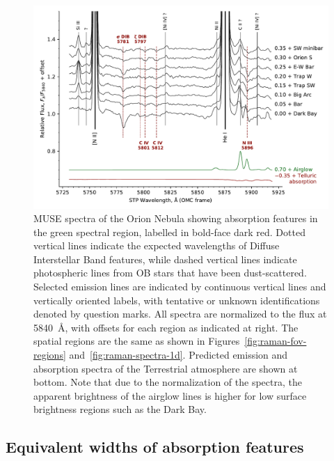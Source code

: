 \documentclass[useAMS, usenatbib, a4paper]{mnras}
\begin{document}
\begin{figure}
  \centering
  \includegraphics[width=\linewidth]{figs/dib-orion-muse-1d-spectra}
  \caption{
    MUSE spectra of the Orion Nebula showing absorption features
    in the green spectral region,
    labelled in bold-face dark red.
    Dotted vertical lines indicate the expected wavelengths of
    Diffuse Interstellar Band features,
    while dashed vertical lines indicate
    photospheric lines from OB stars that have been dust-scattered. 
    Selected emission lines are indicated by continuous vertical lines
    and vertically oriented labels,
    with tentative or unknown identifications denoted by question marks.
    All spectra are normalized to the flux at \SI{5840}{\angstrom},
    with offsets for each region as indicated at right.
    The spatial regions are the same as shown in
    Figures~\ref{fig:raman-fov-regions} and~\ref{fig:raman-spectra-1d}.
    Predicted emission and absorption spectra of the Terrestrial atmosphere
    are shown at bottom.
    Note that due to the normalization of the spectra,
    the apparent brightness of the airglow lines is higher for
    low surface brightness regions such as the Dark Bay.
  }
  \label{fig:dib-spectra}
\end{figure}

\subsection{Equivalent widths of absorption features}
\label{sec:equiv-widths-absorpt}
\end{document}
